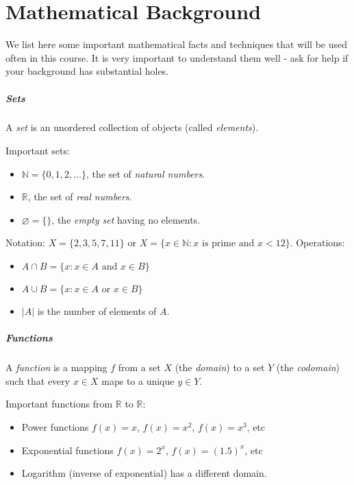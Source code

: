 \chapter{Mathematical Background}
\label{ch:app:mathtools}

We list here some important mathematical facts and techniques  that will be used often in this course. It is very important to understand them well - ask for help if your background has substantial holes.

\paragraph{Sets}

A \emph{set} is an unordered collection of objects (called \emph{elements}).

Important sets: 
\begin{itemize}
\item $\mathbb{N} = \{0,1,2,\dots \}$, the set of \emph{natural numbers}.
\item $\mathbb{R}$, the set of \emph{real numbers}.
\item $\varnothing = \{\}$, the \emph{empty set} having no elements.
\end{itemize}

Notation: $X = \{2,3,5,7,11\}$ or $X = \{x\in \mathbb{N} : \text{$x$ is prime and $x< 12$}\}$.
Operations: 
\begin{itemize}
\item $A\cap B = \{x: x\in A \text{ and } x\in B\}$
\item $A\cup B = \{x: x\in A \text{ or  } x\in B\}$
\item $|A|$ is the number of elements of $A$.
\end{itemize}


\paragraph{Functions}

A \emph{function} is a mapping $f$ from a set $X$ (the \emph{domain}) to a set $Y$ (the \emph{codomain}) such that every $x\in X$ maps to a unique $y\in Y$.

Important functions from $\mathbb{R}$ to $\mathbb{R}$: 
\begin{itemize}
\item Power functions $f(x) = x$, $f(x) = x^2$, $f(x) = x^3$, etc
\item Exponential functions $f(x) = 2^x$, $f(x) = (1.5)^x$, etc
\item Logarithm (inverse of exponential) has a different domain.
\end{itemize}

